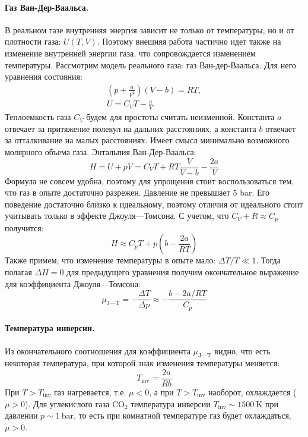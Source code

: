 \documentclass[a4paper,12pt]{report}
\begin{document}
\begin{multicols}{2}
        \paragraph*{Газ Ван-Дер-Ваальса.} В реальном газе внутренняя энергия зависит не только от температуры, но и от плотности газа: $U(T,V)$. Поэтому внешняя работа частично идет также на изменение внутренней энергии газа, что сопровождается изменением температуры. Рассмотрим модель реального газа: газ Ван-дер-Ваальса. Для него уравнения состояния:
        \begin{gather*}
            \left(p+\frac{a}{V^2}\right)(V-b)=RT,\\ 
            U=C_V T - \frac{a}{V}.
        \end{gather*}  
        Теплоемкость газа $C_V$ будем для простоты считать неизменной. Константа $a$ отвечает за притяжение полекул на дальних расстояниях, а константа $b$ отвечает за отталкивание на малых расстояниях. Имеет смысл минимально возможного молярного объема газа. Энтальпия Ван-Дер-Ваальса:
        \begin{equation}
            H=U+pV=C_V T + RT \frac{V}{V-b}-\frac{2a}{V}
        \end{equation}
        Формула не совсем удобна, поэтому для упрощения стоит воспользоваться тем, что газ в опыте достаточно разрежен. Давление не превышает 5 bar. Его поведение достаточно близко к идеальному, поэтому отличия от идеального стоит учитывать только в эффекте Джоуля---Томсона. С учетом, что $C_V+R\approx C_p$ получится:
        \begin{equation}
            H \approx C_p T + p \left(b-\frac{2a}{RT}\right)
        \end{equation}
        Также примем, что изменение температуры в опыте мало: $\Delta T/T \ll 1$. Тогда полагая $\Delta H = 0$ для предыдущего уравнения получим окончательное выражение для коэффициента Джоуля---Томсона:
        \begin{equation}
            \label{j-tfinal}
            \mu_{\text{J---T}}=-\frac{\Delta T}{\Delta p}\approx -\frac{b-2a/RT}{C_p}
        \end{equation}
        \paragraph*{Температура инверсии.} Из окончательного соотношения для коэффициента $\mu_{\text{J---T}}$ видно, что есть некоторая температура, при которой знак изменения температуры меняется:
        \begin{equation*}
            T_\text{inv}=\frac{2a}{Rb}
        \end{equation*}
        При $T>T_\text{inv}$ газ нагревается, т.е. $\mu < 0$, а при $T>T_\text{inv}$ наоборот, охлаждается ($\mu > 0$). Для углекислого газа $\text{CO}_2$ температура инверсии $T_\text{inv}\sim 1500\ \text{K}$ при давлении $p \sim 1 \ \text{bar}$, то есть при комнатной температуре газ будет охлаждаться, $\mu > 0$.
    \end{multicols}
    \newpage
\end{document}
